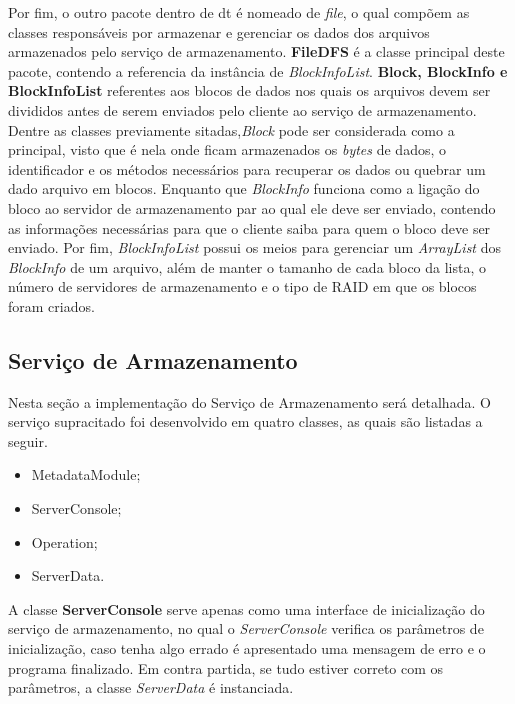 Por fim, o outro pacote dentro de dt é nomeado de \textit{file}, o qual compõem as classes responsáveis por armazenar e gerenciar os dados dos arquivos armazenados pelo serviço de armazenamento. \textbf{FileDFS} é a classe principal deste pacote, contendo a referencia da instância de \textit{BlockInfoList}. \textbf{Block, BlockInfo e BlockInfoList} referentes aos blocos de dados nos quais os arquivos devem ser divididos antes de serem enviados pelo cliente ao serviço de armazenamento. Dentre as classes previamente sitadas,\textit{Block} pode ser considerada como a principal, visto que é nela onde ficam armazenados os \textit{bytes} de dados, o identificador e os métodos necessários para recuperar os dados ou quebrar um dado arquivo em blocos. Enquanto que \textit{BlockInfo} funciona como a ligação do bloco ao servidor de armazenamento par ao qual ele deve ser enviado, contendo as informações necessárias para que o cliente saiba para quem o bloco deve ser enviado. Por fim, \textit{BlockInfoList} possui os meios para gerenciar um \textit{ArrayList} dos \textit{BlockInfo} de um arquivo, além de manter o tamanho de cada bloco da lista, o número de servidores de armazenamento e o tipo de RAID em que os blocos foram criados.
\\

\subsection{Serviço de Armazenamento}
Nesta seção a implementação do Serviço de Armazenamento será detalhada. O serviço supracitado foi desenvolvido em quatro classes, as quais são listadas a seguir.
\\

\begin{itemize}
	\item MetadataModule;
	\item ServerConsole;
	\item Operation;
	\item ServerData.
\end{itemize}

A classe \textbf{ServerConsole} serve apenas como uma interface de inicialização do serviço de armazenamento, no qual o \textit{ServerConsole} verifica os parâmetros de inicialização, caso tenha algo errado é apresentado uma mensagem de erro e o programa finalizado. Em contra partida, se tudo estiver correto com os parâmetros, a classe \textit{ServerData} é instanciada.
\\


